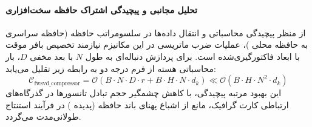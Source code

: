 \paragraph{تحلیل مجانبی و پیچیدگی اشتراک حافظه سخت‌افزاری}
از منظر پیچیدگی محاسباتی و انتقال داده‌ها در سلسومراتب حافظه (حافظه سراسری  به حافظه محلی )، عملیات ضرب ماتریسی در این مکانیزم نیازمند تخصیص بافر موقت با ابعاد فاکتورگیری‌شده است. برای پردازش دنباله‌ای به طول $N$ با بعد مخفی $D$، بار محاسباتی هسته از فرم درجه دو به رابطه زیر تقلیل می‌یابد:
\begin{equation}
\label{eq:complexity_fwsvd_compressor}
\mathcal{C}_{\text{fwsvd\_compressor}} = \mathcal{O}\left( B \cdot N \cdot D \cdot r + B \cdot H \cdot N \cdot d_k \right) \ll \mathcal{O}\left( B \cdot H \cdot N^2 \cdot d_k \right)
\end{equation}
این بهبود مرتبه پیچیدگی، با کاهش چشمگیر حجم تبادل تانسورها در گذرگاه‌های ارتباطی کارت گرافیک، مانع از اشباع پهنای باند حافظه (پدیده ) در فرآیند استنتاج طولانی‌مدت می‌گردد.
